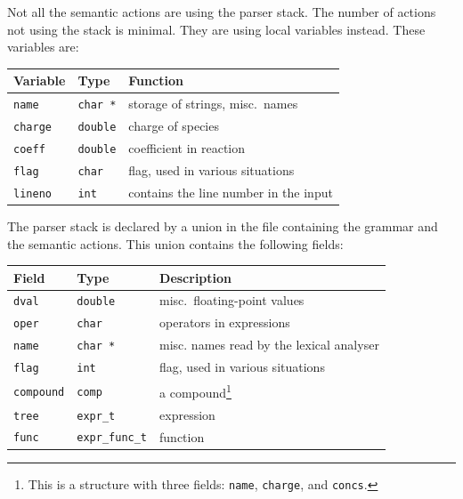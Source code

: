 Not all the semantic actions are using the parser stack. The number of
actions not using the stack is minimal. They are using 
local variables instead. These variables are:

\vspace{0.2cm}
\begin{center}
\begin{tabular}{lll}
\hline
 Variable        & Type           & Function     \\ \hline
 {\tt name}      & {\tt char *}   & storage of strings, misc.\ names \\ 
 {\tt charge}    & {\tt double}   & charge of species \\ 
 {\tt coeff}     & {\tt double}   & coefficient in reaction \\ 
 {\tt flag}      & {\tt char}     & flag, used in various situations
 \\
 {\tt lineno}    & {\tt int}      & contains the line number in the
 input \\
\hline
\end{tabular}
\end{center}
\vspace{0.2cm}

The parser stack is declared by a union in the file containing the 
grammar and the semantic actions. This union contains the following fields:

\vspace{0.2cm}
\begin{center}
\begin{tabular}{lll}
  \hline
  Field       & Type         & Description \\ \hline 
  {\tt dval}  & {\tt double} & misc.\ floating-point values \\
  {\tt oper}  & {\tt char}   & operators in expressions \\ 
  {\tt name}  & {\tt char *} & misc. names read by the lexical analyser \\ 
  {\tt flag}  & {\tt int}    & flag, used in various situations \\
  {\tt compound} & {\tt comp} & a compound\footnote{This is a
    structure with three fields: {\tt name}, {\tt charge}, and {\tt concs}.} \\
  {\tt tree}  & {\tt expr\_t}   & expression \\
  {\tt func}  & {\tt expr\_func\_t} & function \\ 
\hline
\end{tabular}
\end{center}
\vspace{0.2cm}

